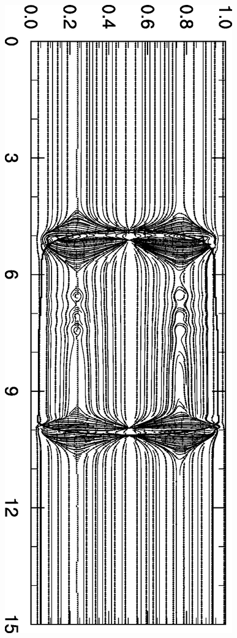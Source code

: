 \documentclass{article}
\begin{document}
\begin{figure}
\includegraphics[angle=90,width=\textwidth]{Figures/original.eps}\\

\end{figure}
\end{document}
